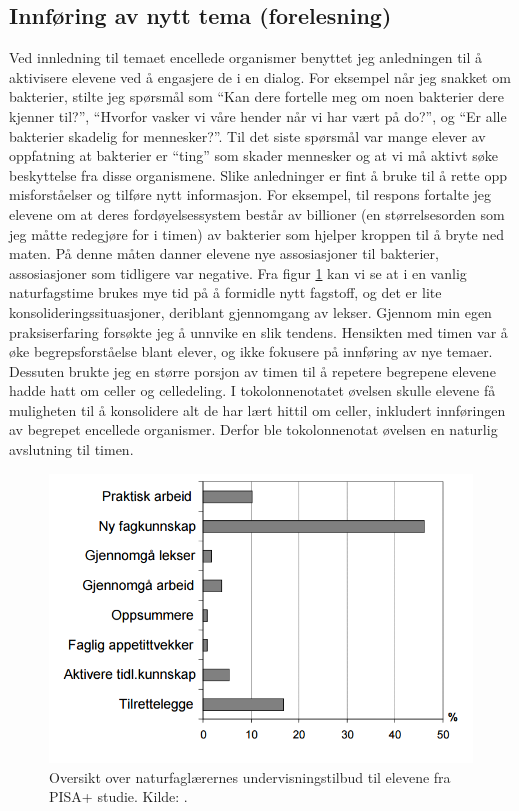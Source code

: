 \documentclass[main.tex]{subfiles}
\begin{document}
\subsection*{Innføring av nytt tema (forelesning)}
Ved innledning til temaet encellede organismer 
benyttet jeg anledningen til å aktivisere elevene ved å engasjere de i en dialog. For eksempel
når jeg snakket om bakterier, stilte jeg spørsmål som ``Kan dere fortelle meg om noen bakterier dere kjenner
til?'', ``Hvorfor vasker vi våre hender når vi har vært på do?'', og ``Er alle bakterier skadelig for mennesker?''.
Til det siste spørsmål var mange elever av oppfatning at bakterier er ``ting'' som skader mennesker og at vi
må aktivt søke beskyttelse fra disse organismene. Slike anledninger er fint å bruke til å rette opp 
misforståelser og tilføre nytt informasjon. For eksempel, til respons fortalte jeg elevene om at deres
fordøyelsessystem består av billioner (en størrelsesorden som jeg måtte redegjøre for i timen) av bakterier 
som hjelper kroppen til å bryte ned maten. På denne måten danner elevene nye assosiasjoner til bakterier,
assosiasjoner som tidligere var negative.
\newline
\newline
Fra figur \ref{fig:odeg10} kan vi se at i en vanlig naturfagstime brukes mye tid på å formidle 
nytt fagstoff, og det er lite konsolideringssituasjoner, deriblant gjennomgang av lekser. Gjennom
min egen praksiserfaring forsøkte jeg å unnvike en slik tendens. Hensikten med timen var å øke begrepsforståelse 
blant elever, og ikke fokusere på innføring av nye temaer. Dessuten brukte jeg en større porsjon 
av timen til å repetere begrepene elevene hadde hatt om celler og celledeling. I
tokolonnenotatet øvelsen skulle elevene få muligheten til å konsolidere alt de har lært hittil
om celler, inkludert innføringen av begrepet encellede organismer. Derfor ble tokolonnenotat 
øvelsen en naturlig avslutning til timen.


\begin{figure}[h!]
\includegraphics[scale = 0.6]{../figures/undervisnings_aktivitet.png}
\caption{Oversikt over naturfaglærernes undervisningstilbud til elevene fra PISA+ studie. Kilde: 
\protect{}.}
\label{fig:odeg10}
\end{figure}
\end{document}
